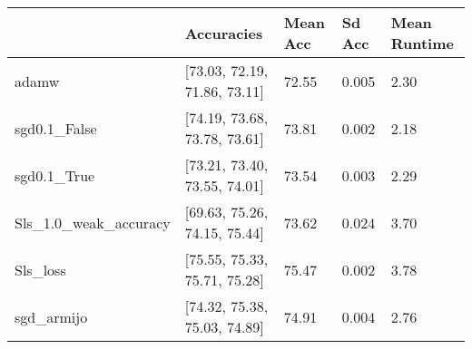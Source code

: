 \begin{tabular}{lllll}
\toprule
{} &                    Accuracies & Mean Acc & Sd Acc & Mean Runtime \\
\midrule
adamw                 &  [73.03, 72.19, 71.86, 73.11] &    72.55 &  0.005 &         2.30 \\
sgd0.1\_False          &  [74.19, 73.68, 73.78, 73.61] &    73.81 &  0.002 &         2.18 \\
sgd0.1\_True           &  [73.21, 73.40, 73.55, 74.01] &    73.54 &  0.003 &         2.29 \\
Sls\_1.0\_weak\_accuracy &  [69.63, 75.26, 74.15, 75.44] &    73.62 &  0.024 &         3.70 \\
Sls\_loss              &  [75.55, 75.33, 75.71, 75.28] &    75.47 &  0.002 &         3.78 \\
sgd\_armijo            &  [74.32, 75.38, 75.03, 74.89] &    74.91 &  0.004 &         2.76 \\
\bottomrule
\end{tabular}
